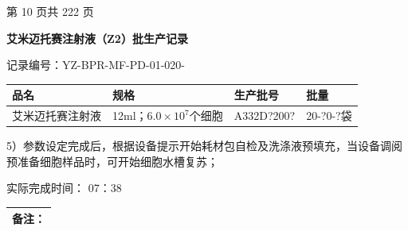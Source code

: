 \documentclass[UTF8,10pt,a4paper,fontset=fandol]{ctexart}
\newcommand{\fieldvalue}[1]{#1}
\newcommand{\handwritten}[1]{#1}
\begin{document}

\vfill

\begin{center}
第 10 页\quad 共 222 页
\end{center}

\newpage

\begin{center}
\textbf{艾米迈托赛注射液（Z2）批生产记录}
\end{center}

记录编号：YZ-BPR-MF-PD-01-020-

\begin{tabularx}{\textwidth}{|X|X|X|X|}
\hline
品名 & 规格 & 生产批号 & 批量 \\
\hline
艾米迈托赛注射液 & 12ml；$6.0\times10^{7}$个细胞 &
\fieldvalue{\handwritten{A332D?200?}} &
\fieldvalue{\handwritten{20-?0-?袋}} \\
\hline
\end{tabularx}

\vspace{0.5em}

5）参数设定完成后，根据设备提示开始耗材包自检及洗涤液预填充，当设备调阅预准备细胞样品时，可开始细胞水槽复苏；

实际完成时间：
\fieldvalue{\handwritten{07：38}}

\begin{tabularx}{\textwidth}{|X|}
\hline
备注：\\[1.5em]
\hline
\end{tabularx}
\end{document}
